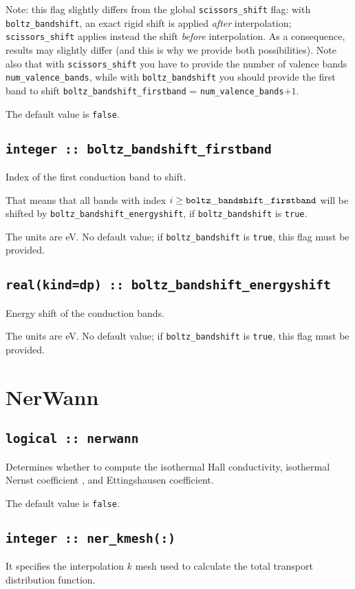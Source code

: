 Note: this flag slightly differs from the global {\tt scissors\_shift} flag: with {\tt boltz\_bandshift}, an exact rigid shift is applied \emph{after} interpolation; {\tt scissors\_shift} applies instead the shift \emph{before} interpolation. As a consequence, results may slightly differ (and this is why we provide both possibilities). Note also that with {\tt scissors\_shift} you have to provide the number of valence bands {\tt num\_valence\_bands}, while with {\tt boltz\_bandshift} you should provide the first band to shift {\tt boltz\_bandshift\_firstband} = {\tt num\_valence\_bands}$+1$.

The default value is \verb#false#.

\subsection[boltz\_bandshift\_firstband]{\tt integer :: boltz\_bandshift\_firstband}
Index of the first conduction band to shift.

That means that all bands with index $i\ge {\tt boltz\_bandshift\_firstband}$ will be shifted by  {\tt boltz\_bandshift\_energyshift}, if {\tt boltz\_bandshift} is \verb#true#.

The units are eV.
No default value; if {\tt boltz\_bandshift} is \verb#true#, this flag must be provided.

\subsection[boltz\_bandshift\_energyshift]{\tt real(kind=dp) :: boltz\_bandshift\_energyshift}
Energy shift of the conduction bands.

The units are eV.
No default value; if {\tt boltz\_bandshift} is \verb#true#, this flag must be provided.

\clearpage
\section{NerWann}
\subsection[nerwann]{\tt logical :: nerwann}
Determines whether to compute the isothermal Hall conductivity, isothermal Nernst coefficient , and Ettingshausen coefficient.

The default value is \verb#false#.

\subsection[ner\_kmesh]{\tt integer :: ner\_kmesh(:)}
It specifies the interpolation $k$ mesh used to calculate the total transport distribution function. 

